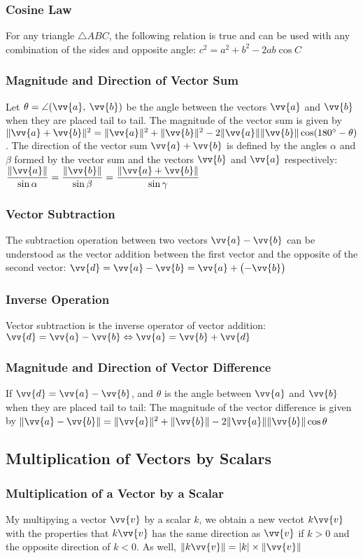 \documentclass{article}
\newcommand{\mv}[1]{
	\lVert\vv{#1}\rVert
}
\begin{document}
	\subsubsection{Cosine Law}
	For any triangle $\triangle ABC$, the following relation is true and can be used with any combination of the sides and opposite angle: $c^2=a^2+b^2-2ab\cos C$
	\subsubsection{Magnitude and Direction of Vector Sum}
	Let $\theta=\angle (\vv{a},\:\vv{b})$ be the angle between the vectors $\vv{a}$ and $\vv{b}$ when they are placed tail to tail. The magnitude of the vector sum is given by $\lVert\vv{a}+\vv{b}\rVert^2=\mv{a}^2+\mv{b}^2-2\mv{a}\mv{b}\cos(180^\circ-\theta)$. The direction of the vector sum $\vv{a}+\vv{b}$ is defined by the angles $\alpha$ and $\beta$ formed by the vector sum and the vectors $\vv{b}$ and $\vv{a}$ respectively: $\dfrac{\mv{a}}{\sin\alpha}=\dfrac{\mv{b}}{\sin\beta}=\dfrac{\lVert\vv{a}+\vv{b}\rVert}{\sin\gamma}$
	\subsubsection{Vector Subtraction}
	The subtraction operation between two vectors $\vv{a}-\vv{b}$ can be understood as the vector addition between the first vector and the opposite of the second vector: $\vv{d}=\vv{a}-\vv{b}=\vv{a}+\left(-\vv{b}\right)$
	\subsubsection{Inverse Operation}
	Vector subtraction is the inverse operator of vector addition: $\vv{d}=\vv{a}-\vv{b}\Leftrightarrow\vv{a}=\vv{b}+\vv{d}$
	\subsubsection{Magnitude and Direction of Vector Difference}
	If $\vv{d}=\vv{a}-\vv{b}$, and $\theta$ is the angle between $\vv{a}$ and $\vv{b}$ when they are placed tail to tail: %
	The magnitude of the vector difference is given by $\lVert\vv{a}-\vv{b}\rVert=\mv{a}^2+\mv{b}-2\mv{a}\mv{b}\cos\theta$
	\subsection{Multiplication of Vectors by Scalars}
	\subsubsection{Multiplication of a Vector by a Scalar}
	My multipying a vector $\vv{v}$ by a scalar $k$, we obtain a new vectot $k\vv{v}$ with the properties that $k\vv{v}$ has the same direction as $\vv{v}$ if $k>0$ and the opposite direction of $k<0$. As well, $\lVert k\vv{v}\rVert=|k|\times\mv{v}$
\end{document}
